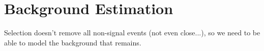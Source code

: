 \chapter{Background Estimation}

Selection doesn't remove all non-signal events (not even close...), so we need to be able to model the background that remains.
